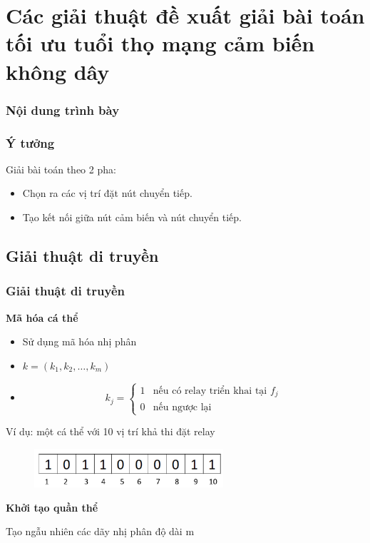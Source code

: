 \section{Các giải thuật đề xuất giải bài toán tối ưu tuổi thọ mạng cảm biến không dây}
\begin{frame}[noframenumbering]
  \frametitle{Nội dung trình bày}
  \tableofcontents[currentsection]
\end{frame}

\begin{frame}
    \frametitle{Ý tưởng}
    Giải bài toán theo 2 pha:
    \begin{itemize}
        \item Chọn ra các vị trí đặt nút chuyển tiếp.
        \item Tạo kết nối giữa nút cảm biến và nút chuyển tiếp.
    \end{itemize}
\end{frame}

\subsection{Giải thuật di truyền}
\begin{frame}
    \frametitle{Giải thuật di truyền}
    \textbf{Mã hóa cá thể}
    \begin{itemize}
        \item Sử dụng mã hóa nhị phân 
        \item $k = (k_1, k_2,…, k_m)$
        \item[] \begin{equation*}
            k_j = \begin{cases}
                1 & \textrm{nếu có relay triển khai tại $f_j$}\\
                0 & \textrm{nếu ngược lại}
            \end{cases}
        \end{equation*}
    \end{itemize} 
    
    Ví dụ: một cá thể với 10 vị trí khả thi đặt relay

    \begin{figure}[h]
        \centering
        \includegraphics[width=7cm]{picture/indi_encoding.png}
    \end{figure}

    \textbf{Khởi tạo quần thể}

    Tạo ngẫu nhiên các dãy nhị phân độ dài m 
\end{frame}

